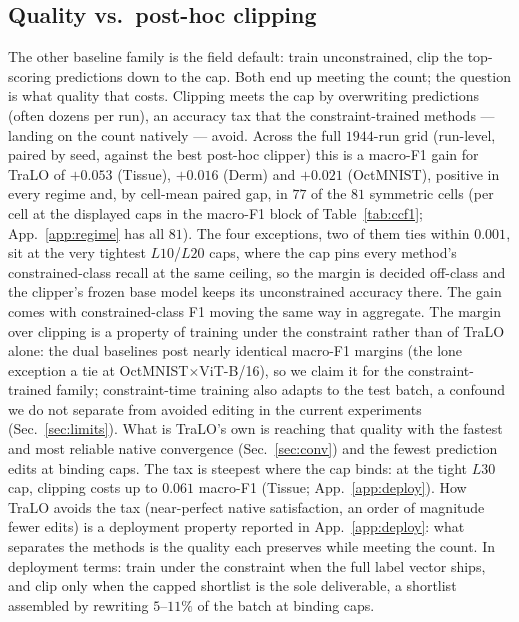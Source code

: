 \documentclass[10pt]{article}
\begin{document}
\subsection{Quality vs.\ post-hoc clipping}
\label{sec:deploy}

The other baseline family is the field default: train unconstrained, clip
the top-scoring predictions down to the cap. Both end up meeting the
count; the question is what quality that costs. Clipping meets the cap by
overwriting predictions (often dozens per run), an accuracy tax that the
constraint-trained methods --- landing on the count natively --- avoid.
Across the full $1944$-run grid (run-level, paired by seed, against the
best post-hoc clipper) this is a macro-F1 gain for TraLO of $+0.053$
(Tissue), $+0.016$ (Derm) and $+0.021$ (OctMNIST), positive in every
regime and, by cell-mean paired gap, in $77$ of the $81$ symmetric cells
(per cell at the displayed caps in the macro-F1 block of
Table~\ref{tab:ccf1}; App.~\ref{app:regime} has all $81$). The four
exceptions, two of them ties within $0.001$, sit at the very tightest
$L10$/$L20$ caps, where the cap pins every method's constrained-class
recall at the same ceiling, so the margin is decided off-class and the
clipper's frozen base model keeps its unconstrained accuracy there. The
gain comes with constrained-class F1 moving the same way in aggregate.
The margin over clipping is a property of training under the constraint
rather than of TraLO alone: the dual baselines post nearly identical
macro-F1 margins (the lone exception a tie at OctMNIST$\times$ViT{\color{blue}-B/16}), so we
claim it for the constraint-trained family; constraint-time training also
adapts to the test batch, a confound we do not separate from avoided
editing in the current experiments (Sec.~\ref{sec:limits}). What is
TraLO's own is reaching that quality with the fastest and most reliable
native convergence (Sec.~\ref{sec:conv}) and the fewest prediction edits
at binding caps. The tax is steepest where the cap binds: at the tight
$L30$ cap, clipping costs up to $0.061$ macro-F1 (Tissue;
App.~\ref{app:deploy}). How TraLO avoids the tax (near-perfect native
satisfaction, an order of magnitude fewer edits) is a deployment property
reported in App.~\ref{app:deploy}: what separates the methods is the
quality each preserves while meeting the count. In deployment terms:
train under the constraint when the full label vector ships, and clip only
when the capped shortlist is the sole deliverable, a shortlist assembled
by rewriting $5$--$11\%$ of the batch at binding caps.
\end{document}
